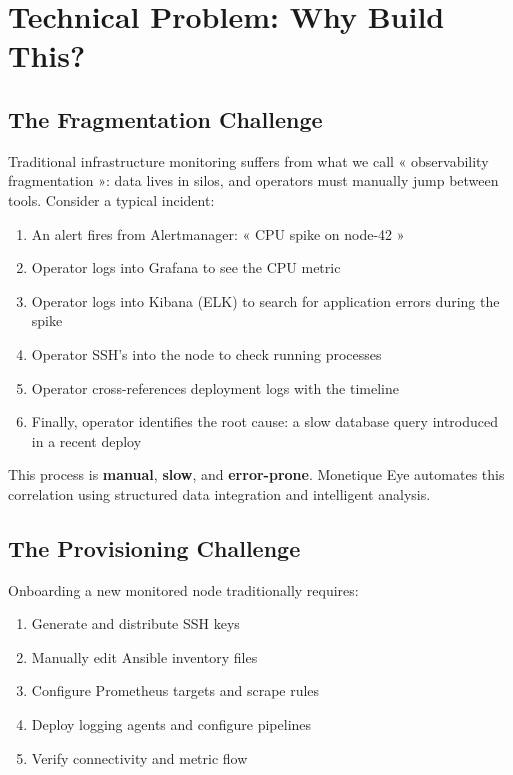 \documentclass[12pt,a4paper]{report}
\begin{document}
\section{Technical Problem: Why Build This?}

\subsection{The Fragmentation Challenge}

Traditional infrastructure monitoring suffers from what we call « observability fragmentation »: data lives in silos, and operators must manually jump between tools. Consider a typical incident:

\begin{enumerate}
  \item An alert fires from Alertmanager: « CPU spike on node-42 »
  \item Operator logs into Grafana to see the CPU metric
  \item Operator logs into Kibana (ELK) to search for application errors during the spike
  \item Operator SSH's into the node to check running processes
  \item Operator cross-references deployment logs with the timeline
  \item Finally, operator identifies the root cause: a slow database query introduced in a recent deploy
\end{enumerate}

This process is \textbf{manual}, \textbf{slow}, and \textbf{error-prone}. Monetique Eye automates this correlation using structured data integration and intelligent analysis.

\subsection{The Provisioning Challenge}

Onboarding a new monitored node traditionally requires:
\begin{enumerate}
  \item Generate and distribute SSH keys
  \item Manually edit Ansible inventory files
  \item Configure Prometheus targets and scrape rules
  \item Deploy logging agents and configure pipelines
  \item Verify connectivity and metric flow
\end{enumerate}
\end{document}
